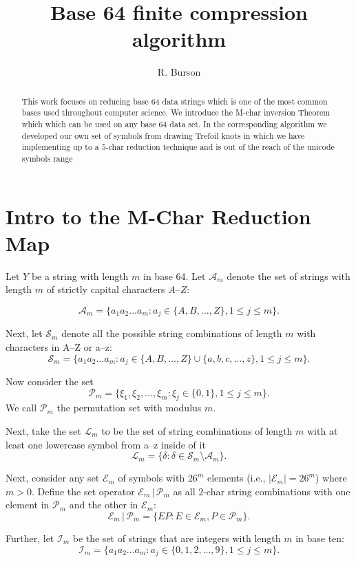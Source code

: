 \documentclass[amsmath,12pt,a4paper]{amsart}
\title[Base 64 finite compression algorithm] {Base 64 finite compression algorithm}
\author{R. Burson}
\begin{document}
\maketitle
\begin{abstract}
This work focuses on reducing base 64 data strings which is one of the most common bases used throughout computer science. We introduce the M-char inversion Theorem which which can be used on any base $64$ data set. In the corresponding algorithm we developed our own set
of symbols from drawing Trefoil knots in which we have implementing up to a $5$-char reduction technique and is out of the reach of the unicode symbols range
\end{abstract}

\section{Intro to the M-Char Reduction Map}

Let $Y$ be a string with length $m$ in base 64. Let $\mathcal{A}_m$ denote the set of strings with length $m$ of strictly capital characters $A–Z$:

$$
\mathcal{A}_m = \{ a_1a_2 \dots a_m : a_j \in \{A, B, \dots, Z\}, 1 \leq j \leq m \}.
$$

Next, let $\mathcal{S}_m$ denote all the possible string combinations of length $m$ with characters in A–Z or a–z:
\[
\mathcal{S}_m = \{ a_1a_2 \dots a_m : a_j \in \{A, B, \dots, Z\} \cup \{a, b, c, \dots, z\}, 1 \leq j \leq m \}.
\]

Now consider the set
$$
\mathcal{P}_m = \{ \xi_1, \xi_2, \dots, \xi_m : \xi_j \in \{0, 1\}, 1 \leq j \leq m \}.
$$
We call $\mathcal{P}_m$ the permutation set with modulus $m$. 

Next, take the set $\mathcal{L}_m$ to be the set of string combinations of length $m$ with at least one lowercase symbol from a–z inside of it
$$
\mathcal{L}_m = \{ \delta : \delta \in \mathcal{S}_m \setminus \mathcal{A}_m \}.
$$

Next, consider any set $\mathcal{E}_m$ of symbols with $26^m$ elements (i.e., $|\mathcal{E}_m| = 26^m$) where $m > 0$. Define the set operator $\mathcal{E}_m \, | \, \mathcal{P}_m$ as all 2-char string combinations with one element in $\mathcal{P}_m$ and the other in $\mathcal{E}_m$:
\[
\mathcal{E}_m \, | \, \mathcal{P}_m = \{ EP : E \in \mathcal{E}_m, P \in \mathcal{P}_m \}.
\]

Further, let $\mathcal{I}_m$ be the set of strings that are integers with length $m$ in base ten:
\[
\mathcal{I}_m = \{ a_1a_2 \dots a_m : a_j \in \{0, 1, 2, \dots, 9\}, 1 \leq j \leq m \}.
\]
\end{document}
